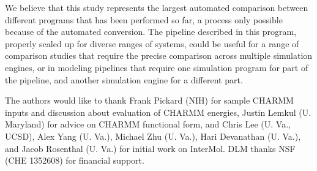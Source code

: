 We believe that this study represents the largest automated comparison
between different programs that has been performed so far, a process
only possible because of the automated conversion. The pipeline
described in this program, properly scaled up for diverse ranges of
systems, could be useful for a range of comparison studies that
require the precise comparison across multiple simulation engines, or
in modeling pipelines that require one simulation program for part of
the pipeline, and another simulation engine for a different part.

\begin{acknowledgements}
The authors would like to thank Frank Pickard (NIH) for sample CHARMM
inputs and discussion about evaluation of CHARMM energies, Justin
Lemkul (U. Maryland) for advice on CHARMM functional form, and Chris
Lee (U. Va., UCSD), Alex Yang (U. Va.), Michael Zhu (U. Va.), Hari
Devanathan (U. Va.), and Jacob Rosenthal (U. Va.)  for initial work on
InterMol. DLM thanks NSF (CHE 1352608) for financial support.
\end{acknowledgements}

